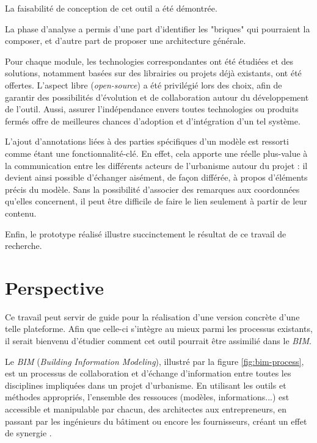 La faisabilité de conception de cet outil a été démontrée.

La phase d'analyse a permis d'une part d'identifier les "briques" qui pourraient la composer, et d'autre part de proposer une architecture générale.

Pour chaque module, les technologies correspondantes ont été étudiées et des solutions, notamment basées sur des librairies ou projets déjà existants, ont été offertes. 
L'aspect libre (\textit{open-source}) a été privilégié lors des choix, afin de garantir des possibilités d'évolution et de collaboration autour du développement de l'outil. Aussi, assurer l'indépendance envers toutes technologies ou produits fermés offre de meilleures chances d'adoption et d'intégration d'un tel système.

L'ajout d'annotations liées à des parties spécifiques d'un modèle est ressorti comme étant une fonctionnalité-clé. 
En effet, cela apporte une réelle plus-value à la communication entre les différents acteurs de l'urbanisme autour du projet : il devient ainsi possible d'échanger aisément, de façon différée, à propos d'éléments précis du modèle. 
Sans la possibilité d'associer des remarques aux coordonnées qu'elles concernent, il peut être difficile de faire le lien seulement à partir de leur contenu.

Enfin, le prototype réalisé illustre succinctement le résultat de ce travail de recherche.

\section{Perspective}
Ce travail peut servir de guide pour la réalisation d'une version concrète d'une telle plateforme. Afin que celle-ci s'intègre au mieux parmi les processus existants, il serait bienvenu d'étudier comment cet outil pourrait être assimilié dans le \textit{BIM}.

Le \textit{BIM} (\textit{Building Information Modeling}), illustré par la figure \ref{fig:bim-process}, est un processus de collaboration et d'échange d'information entre toutes les disciplines impliquées dans un projet d'urbanisme. En utilisant les outils et méthodes appropriés, l'ensemble des ressouces (modèles, informations...) est accessible et manipulable par chacun, des architectes aux entrepreneurs, en passant par les ingénieurs du bâtiment ou encore les fournisseurs, créant un effet de synergie \cite{buildingsmart}.

